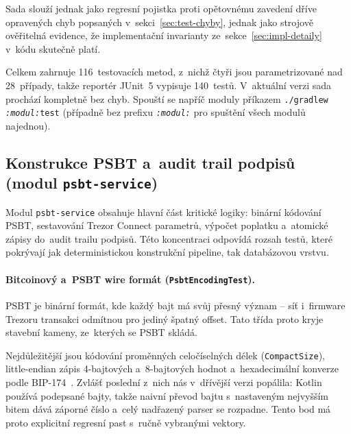Sada slouží jednak jako regresní pojistka proti opětovnému zavedení
dříve opravených chyb popsaných v~sekci~\ref{sec:test-chyby}, jednak
jako strojově ověřitelná evidence, že implementační invarianty
ze~sekce~\ref{sec:impl-detaily} v~kódu skutečně platí.

Celkem zahrnuje 116~testovacích metod, z~nichž čtyři jsou parametrizované
nad 28~případy, takže reportér JUnit~5 vypisuje 140~testů. V~aktuální
verzi sada prochází kompletně bez chyb. Spouští se napříč moduly příkazem
\texttt{./gradlew \textit{:modul:}test} (případně bez prefixu
\texttt{\textit{:modul:}} pro spuštění všech modulů najednou).

\subsection[Konstrukce PSBT a~audit trail podpisů]{Konstrukce PSBT
a~audit trail podpisů (modul \texttt{psbt-service})}
\label{subsec:test-psbt}

Modul \texttt{psbt-service} obsahuje hlavní část kritické logiky:
binární kódování PSBT, sestavování Trezor Connect parametrů, výpočet
poplatku a~atomické zápisy do~audit trailu podpisů. Této koncentraci
odpovídá rozsah testů, které pokrývají jak deterministickou
konstrukční pipeline, tak databázovou vrstvu.

\paragraph{Bitcoinový a~PSBT wire formát
(\texttt{PsbtEncodingTest}).}
PSBT je binární formát, kde každý bajt má svůj přesný význam --
síť i~firmware Trezoru transakci odmítnou pro jediný špatný offset.
Tato třída proto kryje stavební kameny, ze~kterých se PSBT skládá.

Nejdůležitější jsou kódování proměnných celočíselných délek
(\texttt{CompactSize}), little-endian zápis 4-bajtových a~8-bajtových
hodnot a~hexadecimální konverze podle BIP-174~\cite{BIP174}. Zvlášť
poslední z~nich nás v~dřívější verzi popálila: Kotlin používá
podepsané bajty, takže naivní převod bajtu s~nastaveným nejvyšším
bitem dává záporné číslo a~celý nadřazený parser se rozpadne. Tento
bod má proto explicitní regresní past s~ručně vybranými vektory.

